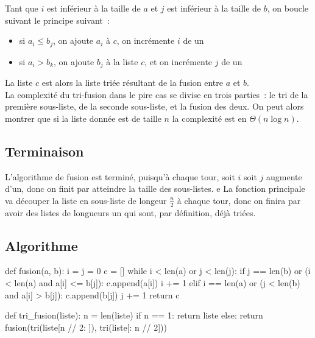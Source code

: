 		Tant que $i$ est inférieur à la taille de $a$ et $j$ est inférieur à la taille de $b$, on boucle suivant le principe suivant~:
		\begin{itemize}
			\item si $a_i \leq b_j$, on ajoute $a_i$ à $c$, on incrémente $i$ de un
			\item si $a_i > b_k$, on ajoute $b_j$ à la liste $c$, et on incrémente $j$ de un
		\end{itemize}
		La liste $c$ est alors la liste triée résultant de la fusion entre $a$ et $b$. \\
		
		La complexité du tri-fusion dans le pire cas se divise en trois parties~: le tri de la première sous-liste, de la seconde sous-liste, et la fusion des deux. On peut alors montrer que si la liste donnée est de taille $n$ la complexité est en $\Theta(n \log n)$.
		
	\subsection{Terminaison}
	
		L'algorithme de fusion est terminé, puisqu'à chaque tour, soit $i$ soit $j$ augmente d'un, donc on finit par atteindre la taille des sous-listes.
		e
		La fonction principale va découper la liste en sous-liste de longeur $\frac{n}{2}$ à chaque tour, donc on finira par avoir des listes de longueurs un qui sont, par définition, déjà triées.
		
	\subsection{Algorithme}
		
		\begin{pythoncode}
			def fusion(a, b):
				i = j = 0
				c = []
				while i < len(a) or j < len(j):
					if j == len(b) or (i < len(a) and a[i] <= b[j]):
						c.append(a[i])
						i += 1
					elif i == len(a) or (j < len(b) and a[i] > b[j]):
						c.append(b[j])
						j += 1
				return c
			
			def tri_fusion(liste):
				n = len(liste)
				if n == 1: return liste
				else: return fusion(tri(liste[n // 2: ]), tri(liste[: n // 2]))
		\end{pythoncode}
			
			
				
